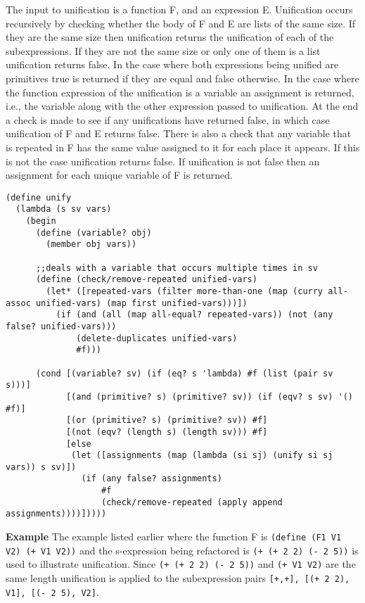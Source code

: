 \documentclass[a4paper,10pt]{article}
\begin{document}
The input to unification is a function F, and an expression E.  Unification occurs recursively by checking whether the body of F and E are lists of the same size.  If they are the same size then unification returns the unification of each of the subexpressions.  If they are not the same size or only one of them is a list unification returns false.  In the case where both expressions being unified are primitives true is returned if they are equal and false otherwise.  In the case where the function expression of the unification is a variable an assignment is returned, i.e., the variable along with the other expression passed to unification.  At the end a check is made to see if any unifications have returned false, in which case unification of F and E returns false.  There is also a check that any variable that is repeated in F has the same value assigned to it for each place it appears.  If this is not the case unification returns false. If unification is not false then an assignment for each unique variable of F is returned.

\begin{lstlisting}[frame=trbl]
(define unify
  (lambda (s sv vars)
    (begin
      (define (variable? obj)
        (member obj vars))

      ;;deals with a variable that occurs multiple times in sv
      (define (check/remove-repeated unified-vars)
        (let* ([repeated-vars (filter more-than-one (map (curry all-assoc unified-vars) (map first unified-vars)))])
          (if (and (all (map all-equal? repeated-vars)) (not (any false? unified-vars)))
              (delete-duplicates unified-vars)
              #f)))
      
      (cond [(variable? sv) (if (eq? s 'lambda) #f (list (pair sv s)))]
            [(and (primitive? s) (primitive? sv)) (if (eqv? s sv) '() #f)]
            [(or (primitive? s) (primitive? sv)) #f]
            [(not (eqv? (length s) (length sv))) #f]
            [else
             (let ([assignments (map (lambda (si sj) (unify si sj vars)) s sv)])
               (if (any false? assignments)
                   #f
                   (check/remove-repeated (apply append assignments))))]))))
\end{lstlisting}

{\bf Example}
The example listed earlier where the function F is \texttt{(define (F1 V1 V2) (+ V1 V2))} and the s-expression being refactored is \texttt{(+ (+ 2 2) (- 2 5))} is used to illustrate unification.  Since \texttt{(+ (+ 2 2) (- 2 5))} and \texttt{(+ V1 V2)} are the same length unification is applied to the subexpression pairs \texttt{[+,+], [(+ 2 2), V1], [(- 2 5), V2]}.
\end{document}

